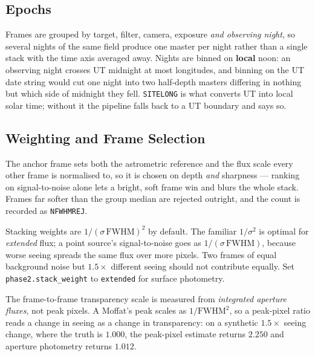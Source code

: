 \documentclass[11pt,a4paper]{article}
\begin{document}
\subsection{Epochs}
Frames are grouped by target, filter, camera, exposure \emph{and observing
night}, so several nights of the same field produce one master per night rather
than a single stack with the time axis averaged away. Nights are binned on
\textbf{local} noon: an observing night crosses UT midnight at most longitudes,
and binning on the UT date string would cut one night into two half-depth
masters differing in nothing but which side of midnight they fell.
\texttt{SITELONG} is what converts UT into local solar time; without it the
pipeline falls back to a UT boundary and says so.

\subsection{Weighting and Frame Selection}
The anchor frame sets both the astrometric reference and the flux scale every
other frame is normalised to, so it is chosen on depth \emph{and} sharpness ---
ranking on signal-to-noise alone lets a bright, soft frame win and blurs the
whole stack. Frames far softer than the group median are rejected outright, and
the count is recorded as \texttt{NFWHMREJ}.

Stacking weights are $1/(\sigma\,\mathrm{FWHM})^2$ by default. The familiar
$1/\sigma^2$ is optimal for \emph{extended} flux; a point source's
signal-to-noise goes as $1/(\sigma\,\mathrm{FWHM})$, because worse seeing
spreads the same flux over more pixels. Two frames of equal background noise but
$1.5\times$ different seeing should not contribute equally. Set
\texttt{phase2.stack\_weight} to \texttt{extended} for surface photometry.

The frame-to-frame transparency scale is measured from \emph{integrated aperture
fluxes}, not peak pixels. A Moffat's peak scales as $1/\mathrm{FWHM}^2$, so a
peak-pixel ratio reads a change in seeing as a change in transparency: on a
synthetic $1.5\times$ seeing change, where the truth is $1.000$, the peak-pixel
estimate returns $2.250$ and aperture photometry returns $1.012$.

\newpage
\end{document}
